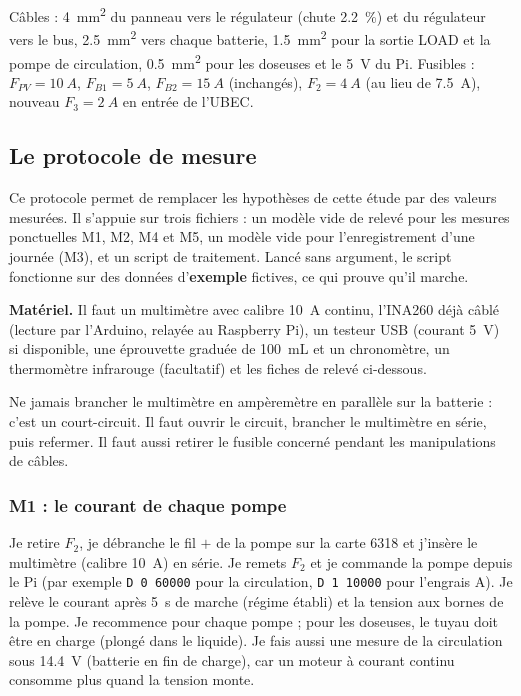 \begin{aretenir}
Câbles : \qty{4}{mm^2} du panneau vers le régulateur (chute \qty{2,2}{\percent}) et du régulateur vers le bus, \qty{2,5}{mm^2} vers chaque batterie, \qty{1,5}{mm^2} pour la sortie LOAD et la pompe de circulation, \qty{0,5}{mm^2} pour les doseuses et le \qty{5}{V} du Pi. Fusibles : $F_{PV} = \qty{10}{A}$, $F_{B1} = \qty{5}{A}$, $F_{B2} = \qty{15}{A}$ (inchangés), $F_2 = \qty{4}{A}$ (au lieu de \qty{7,5}{A}), nouveau $F_3 = \qty{2}{A}$ en entrée de l'UBEC.
\end{aretenir}

\subsection{Le protocole de mesure}

Ce protocole permet de remplacer les hypothèses de cette étude par des valeurs mesurées. Il s'appuie sur trois fichiers : un modèle vide de relevé pour les mesures ponctuelles M1, M2, M4 et M5, un modèle vide pour l'enregistrement d'une journée (M3), et un script de traitement. Lancé sans argument, le script fonctionne sur des données d'\textbf{exemple} fictives, ce qui prouve qu'il marche.

\textbf{Matériel.} Il faut un multimètre avec calibre \qty{10}{A} continu, l'INA260 déjà câblé (lecture par l'Arduino, relayée au Raspberry Pi), un testeur USB (courant \qty{5}{V}) si disponible, une éprouvette graduée de \qty{100}{mL} et un chronomètre, un thermomètre infrarouge (facultatif) et les fiches de relevé ci-dessous.

\begin{attention}
Ne jamais brancher le multimètre en ampèremètre en parallèle sur la batterie : c'est un court-circuit. Il faut ouvrir le circuit, brancher le multimètre en série, puis refermer. Il faut aussi retirer le fusible concerné pendant les manipulations de câbles.
\end{attention}

\subsubsection*{M1 : le courant de chaque pompe}

Je retire $F_2$, je débranche le fil $+$ de la pompe sur la carte 6318 et j'insère le multimètre (calibre \qty{10}{A}) en série. Je remets $F_2$ et je commande la pompe depuis le Pi (par exemple \texttt{D 0 60000} pour la circulation, \texttt{D 1 10000} pour l'engrais A). Je relève le courant après \qty{5}{s} de marche (régime établi) et la tension aux bornes de la pompe. Je recommence pour chaque pompe ; pour les doseuses, le tuyau doit être en charge (plongé dans le liquide). Je fais aussi une mesure de la circulation sous \qty{14,4}{V} (batterie en fin de charge), car un moteur à courant continu consomme plus quand la tension monte.

